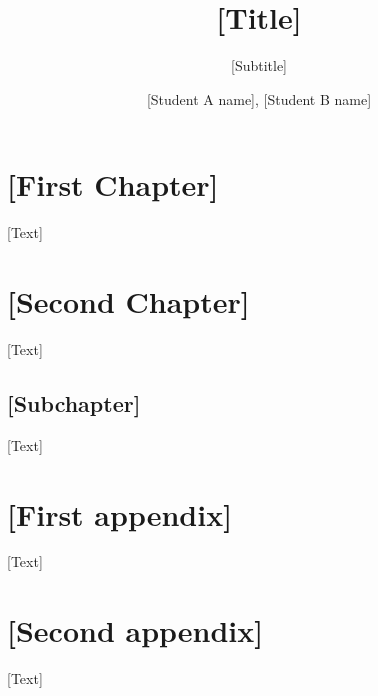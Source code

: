 \documentclass[11pt, a4paper]{resources/JTH}
\title{[Title]}
\subtitle{[Subtitle]}
\author{[Student A name], [Student B name]}
\begin{document}
\maketitle


\begingroup
    \setlength{\parskip}{0pt} %
    \tableofcontents
\endgroup

\newpage


\section{[First Chapter]}

    [Text]

\section{[Second Chapter]}
    
    [Text]

    \subsection{[Subchapter]}

        [Text]

\newpage



\newpage
\begin{appendices} %

\section{[First appendix]}

    [Text]
    
\section{[Second appendix]}

    [Text]

\end{appendices}
\end{document}
